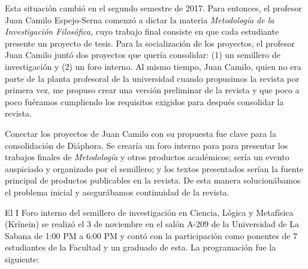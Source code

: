 \documentclass[]{book}
\begin{document}
Esta situación cambió en el segundo semestre de 2017. Para entonces, el
profesor Juan Camilo Espejo-Serna comenzó a dictar la materia
\emph{Metodología de la Investigación Filosófica,} cuyo trabajo final
consiste en que cada estudiante presente un proyecto de tesis. Para la
socialización de los proyectos, el profesor Juan Camilo juntó dos
proyectos que quería consolidar: (1) un semillero de investigación y (2)
un foro interno. Al mismo tiempo, Juan Camilo, quien no era parte de la
planta profesoral de la universidad cuando propusimos la revista por
primera vez, me propuso crear una versión preliminar de la revista y que
poco a poco fuéramos cumpliendo los requisitos exigidos para después
consolidar la revista.

Conectar los proyectos de Juan Camilo con su propuesta fue clave para la
consolidación de Diáphora. Se crearía un foro interno para para
presentar los trabajos finales de \emph{Metodología} y otros productos
académicos; sería un evento auspiciado y organizado por el semillero; y
los textos presentados serían la fuente principal de productos
publicables en la revista. De esta manera solucionábamos el problema
inicial y asegurábamos continuidad de la revista.

El I Foro interno del semillero de investigación en Ciencia, Lógica y
Metafísica (Krínein) se realizó el 3 de noviembre en el salón A-209 de
la Universidad de La Sabana de 1:00 PM a 6:00 PM y contó con la
participación como ponentes de 7 estudiantes de la Facultad y un
graduado de esta. La programación fue la siguiente:
\end{document}
